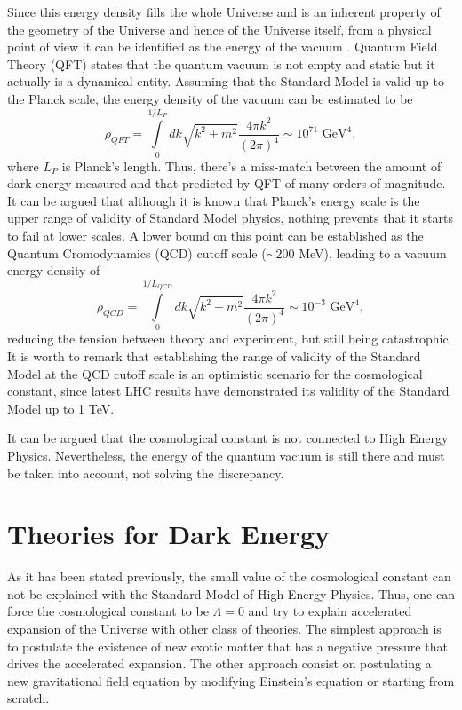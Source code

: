 Since this energy density fills the whole Universe and is an inherent property of the geometry of the Universe and hence of the Universe itself, from a physical point of view it can be identified as the energy of the vacuum \cite{RevModPhys.61.1,2003PhR...380..235P,PhysRevD.72.021301}. Quantum Field Theory (QFT) states that the quantum vacuum is not empty and static but it actually is a dynamical entity. Assuming that the Standard Model is valid up to the Planck scale, the energy density of the vacuum can be estimated to be
\begin{equation}
\rho_{QFT} = \int\limits_0^{1/L_P} dk \sqrt{k^2+m^2}\frac{4\pi k^2}{(2\pi)^4}\sim 10^{71}\mbox{ GeV}^4,
\end{equation}
where $L_P$ is Planck's length. Thus, there's a miss-match between the amount of dark energy measured and that predicted by QFT of many orders of magnitude. It can be argued that although it is known that Planck's energy scale is the upper range of validity of Standard Model physics, nothing prevents that it starts to fail at lower scales. A lower bound on this point can be established as the Quantum Cromodynamics (QCD) cutoff scale ($\sim 200$ MeV), leading to a vacuum energy density of
\begin{equation}
\rho_{QCD} = \int\limits_0^{1/L_{QCD}} dk \sqrt{k^2+m^2}\frac{4\pi k^2}{(2\pi)^4}\sim 10^{-3}\mbox{ GeV}^4,
\end{equation}
reducing the tension between theory and experiment, but still being catastrophic. It is worth to remark that establishing the range of validity of the Standard Model at the QCD cutoff scale is an optimistic scenario for the cosmological constant, since latest LHC results have demonstrated its validity of the Standard Model up to 1 TeV.
\newline

It can be argued that the cosmological constant is not connected to High Energy Physics. Nevertheless, the energy of the quantum vacuum is still there and must be taken into account, not solving the discrepancy.


\section{Theories for Dark Energy}
As it has been stated previously, the small value of the cosmological constant can not be explained with the Standard Model of High Energy Physics. Thus, one can force the cosmological constant to be $\Lambda=0$ and try to explain accelerated expansion of the Universe with other class of theories. The simplest approach is to postulate the existence of new exotic matter that has a negative pressure that drives the accelerated expansion. The other approach consist on postulating a new gravitational field equation by modifying Einstein's equation or starting from scratch.

